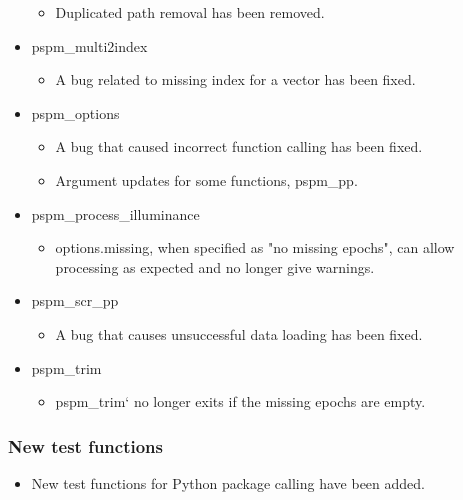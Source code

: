 \documentclass[english]{article}
\numberwithin{equation}{section}
\numberwithin{figure}{section}
\begin{document}
\begin{itemize}
\begin{itemize}
\item Duplicated path removal has been removed.
\end{itemize}

\item pspm\_multi2index

\begin{itemize}
\item A bug related to missing index for a vector has been fixed.
\end{itemize}

\item pspm\_options

\begin{itemize}
\item A bug that caused incorrect function calling has been fixed.

\item Argument updates for some functions, pspm\_pp.
\end{itemize}

\item pspm\_process\_illuminance

\begin{itemize}
\item options.missing, when specified as "no missing epochs", can allow processing as expected and no longer give warnings.
\end{itemize}

\item pspm\_scr\_pp

\begin{itemize}
\item A bug that causes unsuccessful data loading has been fixed.
\end{itemize}

\item pspm\_trim
\begin{itemize}
\item pspm\_trim` no longer exits if the missing epochs are empty.
\end{itemize}
\end{itemize}
\subsubsection*{New test functions}
\begin{itemize}
\item New test functions for Python package calling have been added.
\end{itemize}



\end{document}
